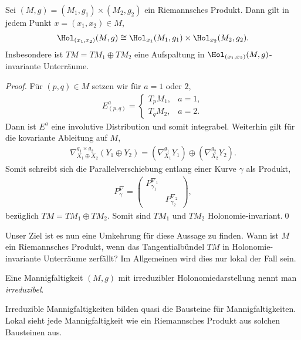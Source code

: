 \documentclass[%
	paper=a5,%
	fleqn,%
	DIV=18,%
	BCOR=0mm,
	fontsize=11pt,
	titlepage=false,%
	bibliography=totoc,
	DIV=18,%
	twoside=true,
	pdftitle=Riemannsche Geometrie,
	pdfauthor=Uwe Semmelmann,
	numbers=noendperiod]%
	{scrbook}
\begin{document}
\begin{prop}
Sei $(M,g) = (M_{1},g_{1})\times (M_{2},g_{2})$ ein Riemannsches Produkt. Dann gilt in jedem Punkt $x=(x_{1},x_{2})\in M$,
\begin{align*}
\Hol_{(x_{1},x_{2})}(M,g) \cong \Hol_{x_{1}}(M_{1},g_{1})\times \Hol_{x_{2}}(M_{2},g_{2}).
\end{align*}
Insbesondere ist $TM=TM_{1}\oplus TM_{2}$ eine Aufspaltung in $\Hol_{(x_1,x_2)}(M,g)$-invariante Unterräume.\fish
\end{prop}

\begin{proof}
Für $(p,q)\in M$ setzen wir für $a=1$ oder $2$,
\begin{align*}
E_{(p,q)}^a = 
\begin{cases}
T_{p}M_{1}, & a=1,\\
T_{q}M_{2}, & a=2.
\end{cases}
\end{align*}
Dann ist $E^a$ eine involutive Distribution und somit integrabel. Weiterhin gilt für die kovariante Ableitung auf $M$,
\begin{align*}
\nabla_{X_{1}\oplus X_{2}}^{g_{1}\times g_{2}}(Y_{1}\oplus Y_{2}) = 
\left(\nabla_{X_{1}}^{g_{1}}Y_{1}\right)\oplus \left(\nabla_{X_{2}}^{g_{2}}Y_{2}\right).
\end{align*}
Somit schreibt sich die Parallelverschiebung entlang einer Kurve $\gamma$ als Produkt,
\begin{align*}
P_{\gamma}^\nabla =
\begin{pmatrix}
P_{\gamma_{1}}^{\nabla_{1}} \\
& P_{\gamma_{2}}^{\nabla_{2}}
\end{pmatrix},
\end{align*}
bezüglich $TM=TM_{1}\oplus TM_{2}$. Somit sind $TM_{1}$ und $TM_{2}$ Holonomie-invariant.\qed
\end{proof}

Unser Ziel ist es nun eine Umkehrung für diese Aussage zu finden. Wann ist $M$ ein Riemannsches Produkt, wenn das Tangentialbündel $TM$ in Holonomie-invariante Unterräume zerfällt? Im Allgemeinen wird dies nur lokal der Fall sein.

\begin{defn}
Eine Mannigfaltigkeit $(M,g)$ mit irreduzibler Holonomiedarstellung nennt man \emph{irreduzibel}.\fish
\end{defn}

Irreduzible Mannigfaltigkeiten bilden quasi die Bausteine für Mannigfaltigkeiten. Lokal sieht jede Mannigfaltigkeit wie ein Riemannsches Produkt aus solchen Bausteinen aus.
\end{document}
